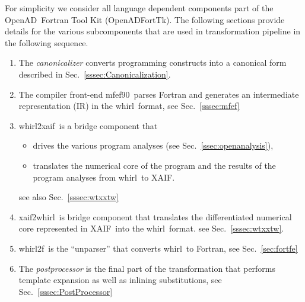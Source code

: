 \documentclass{book}
\newcommand{\mfefninety}{mfef90}
\newcommand{\OpenAD}{OpenAD}
\newcommand{\OpenADFortTk}{OpenADFortTk}
\newcommand{\xaif}{XAIF}
\newcommand{\whirl}{whirl}
\newcommand{\whirlToxaif}{whirl2xaif}
\newcommand{\whirlTof}{whirl2f}
\newcommand{\xaifTowhirl}{xaif2whirl}
\newcommand{\refsec}[1]{{Sec.~\ref{#1}}}
\begin{document}
For simplicity we consider all language dependent components part 
of the \OpenAD\ Fortran Tool Kit (\OpenADFortTk). The following 
sections provide details for the various subcomponents that 
are used in transformation pipeline in the following sequence.
\begin{enumerate}	
\item The {\em canonicalizer} converts  
  programming constructs into a canonical form described in \refsec{sssec:Canonicalization}. 

\item The compiler front-end \mfefninety\  parses
  Fortran and generates an intermediate representation (IR)
  in the \whirl\ format, see \refsec{sssec:mfef}

\item \whirlToxaif\ is a bridge component that
  \begin{itemize}
  \item drives the various program analyses (see \refsec{ssec:openanalysis}),
  \item translates the numerical core of the program and  
    the results of the program analyses from \whirl\ to \xaif.
  \end{itemize} see also \refsec{sssec:wtxxtw}

\item \xaifTowhirl\ is bridge component that translates the 
  differentiated numerical core represented in \xaif\ 
  into the \whirl\ format. see \refsec{sssec:wtxxtw}.

\item \whirlTof\ is the ``unparser'' that converts \whirl\ to
  Fortran, see \refsec{sec:fortfe}

\item The {\em postprocessor} is the  final part of the transformation that
  performs template expansion as well as inlining substitutions, see \refsec{sssec:PostProcessor}

\end{enumerate}

\end{document}
